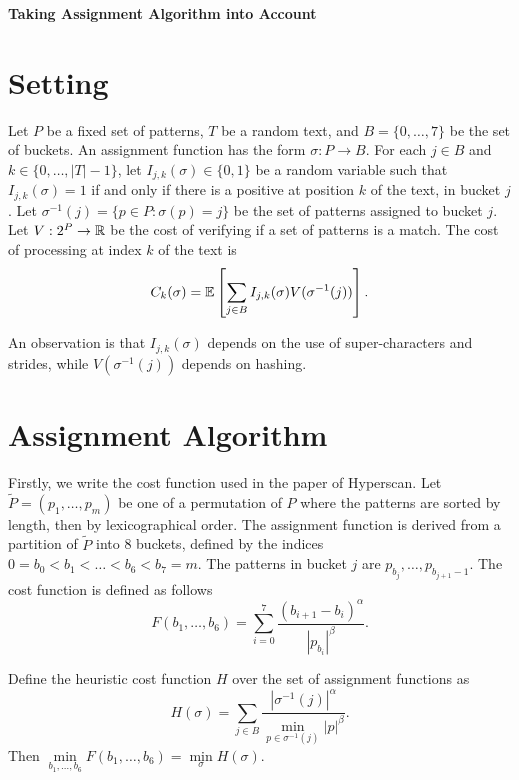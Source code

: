\begin{center}
  \vspace{1em}
  \textbf{\LARGE Taking Assignment Algorithm into Account}\\
  \vspace{1em}
\end{center}

\section{Setting}
Let $P$ be a fixed set of patterns, $T$ be a random text, and $B=\{0,\ldots,7\}$ be the set of buckets. An assignment function has the form $\sigma: P \to B$. For each $j\in B$ and $k\in\{0,\ldots,|T|-1\}$, let $I_{j,k}(\sigma)\in\{0,1\}$ be a random variable such that $I_{j,k}(\sigma) = 1$ if and only if there is a positive at position $k$ of the text, in bucket $j$. Let $\sigma^{-1}(j) = \{p \in P : \sigma(p) = j\}$ be the set of patterns assigned to bucket $j$. Let $V: 2^P\to{\mathbb{R}}$ be the cost of verifying if a set of patterns is a match. The cost of processing at index $k$ of the text is
$$C_k(\sigma) = \mathbb{E}\left[\sum\limits_{j\in B} I_{j,k}(\sigma) V(\sigma^{-1}(j))\right].$$

An observation is that $I_{j,k}(\sigma)$ depends on the use of super-characters and strides, while $V(\sigma^{-1}(j))$ depends on hashing.


\section{Assignment Algorithm}

Firstly, we write the cost function used in the paper of Hyperscan. Let $\tilde{P}=(p_1,\ldots, p_m)$ be one of a permutation of $P$ where the patterns are sorted by length, then by lexicographical order. The assignment function is derived from a partition of $\tilde{P}$ into 8 buckets, defined by the indices $0=b_0 < b_1 < \ldots < b_6 < b_7 = m$. The patterns in bucket $j$ are $p_{b_j},\ldots, p_{b_{j+1}-1}$. The cost function is defined as follows
$$F(b_1,\ldots, b_6) = \sum_{i=0}^{7}\dfrac{(b_{i+1}-b_{i})^\alpha}{|p_{b_{i}}|^\beta}.$$

\begin{proposition}
  Define the heuristic cost function $H$ over the set of assignment functions as
  $$H(\sigma) = \sum_{j\in B}\dfrac{|\sigma^{-1}(j)|^\alpha}{\min\limits_{p \in \sigma^{-1}(j)} |p|^\beta}.$$
  Then $\min\limits_{b_1,\ldots,b_6}F(b_1,\ldots, b_6) = \min\limits_{\sigma} H(\sigma).$
\end{proposition}


